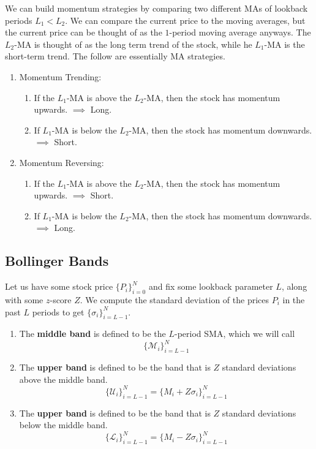 \documentclass{article}
\begin{document}
    We can build momentum strategies by comparing two different MAs of lookback periods $L_1 < L_2$. We can compare the current price to the moving averages, but the current price can be thought of as the $1$-period moving average anyways. The $L_2$-MA is thought of as the long term trend of the stock, while he $L_1$-MA is the short-term trend. The follow are essentially MA strategies. 
    \begin{enumerate}
        \item Momentum Trending: 
        \begin{enumerate}
            \item If the $L_1$-MA is above the $L_2$-MA, then the stock has momentum upwards. $\implies$ Long. 
            \item If $L_1$-MA is below the $L_2$-MA, then the stock has momentum downwards. $\implies$ Short. 
        \end{enumerate}
        
        \item Momentum Reversing: 
        \begin{enumerate}
            \item If the $L_1$-MA is above the $L_2$-MA, then the stock has momentum upwards. $\implies$ Short. 
            \item If $L_1$-MA is below the $L_2$-MA, then the stock has momentum downwards. $\implies$ Long. 
        \end{enumerate}
    \end{enumerate}

  \subsection{Bollinger Bands}

    \begin{definition}
      Let us have some stock price $\{P_i\}_{i=0}^N$ and fix some lookback parameter $L$, along with some $z$-score $Z$. We compute the standard deviation of the prices $P_i$ in the past $L$ periods to get $\{\sigma_i\}_{i=L-1}^N$. 
      \begin{enumerate}
        \item The \textbf{middle band} is defined to be the $L$-period SMA, which we will call 
        \[\{\mathcal{M}_i\}_{i=L-1}^N\] 
        \item The \textbf{upper band} is defined to be the band that is $Z$ standard deviations above the middle band. 
        \[\{\mathcal{U}_i\}_{i=L-1}^N = \{M_i + Z \sigma_i\}_{i=L-1}^N\]
        \item The \textbf{upper band} is defined to be the band that is $Z$ standard deviations below the middle band. 
        \[\{\mathcal{L}_i\}_{i=L-1}^N = \{M_i - Z \sigma_i\}_{i=L-1}^N\]
      \end{enumerate}
    \end{definition}
\end{document}
